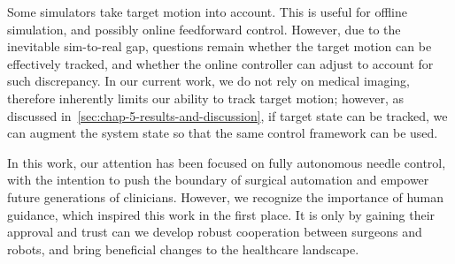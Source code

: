 Some simulators take target motion into account. This is useful for offline simulation, and possibly online feedforward control. However, due to the inevitable sim-to-real gap, questions remain whether the target motion can be effectively tracked, and whether the online controller can adjust to account for such discrepancy. In our current work, we do not rely on medical imaging, therefore inherently limits our ability to track target motion; however, as discussed in~\cref{sec:chap-5-results-and-discussion}, if target state can be tracked, we can augment the system state so that the same control framework can be used.

In this work, our attention has been focused on fully autonomous needle control, with the intention to push the boundary of surgical automation and empower future generations of clinicians. However, we recognize the importance of human guidance, which inspired this work in the first place. It is only by gaining their approval and trust can we develop robust cooperation between surgeons and robots, and bring beneficial changes to the healthcare landscape.

